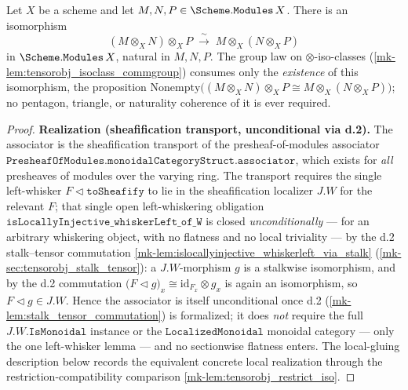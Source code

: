 \begin{lemma}\label{mk-lem:tensorobj_assoc_iso}
  \leanok

  Let \(X\) be a scheme and let
  \(M, N, P \in \Scheme.\mathtt{Modules}\,X\). There is an isomorphism
  \[
    (M \otimes_X N) \otimes_X P
      \;\xrightarrow{\ \sim\ }\;
    M \otimes_X (N \otimes_X P)
  \]
  in \(\Scheme.\mathtt{Modules}\,X\), natural in \(M, N, P\). The group law on
  \(\otimes\)-iso-classes (\ref{mk-lem:tensorobj_isoclass_commgroup}) consumes only
  the \emph{existence} of this isomorphism, the proposition
  \(\mathrm{Nonempty}\bigl((M \otimes_X N) \otimes_X P \cong M \otimes_X (N
  \otimes_X P)\bigr)\); no pentagon, triangle, or naturality coherence of it is
  ever required.

\begin{proof}
  \textbf{Realization (sheafification transport, unconditional via d.2).} The
  associator is the sheafification transport of the presheaf-of-modules associator
  \(\mathtt{PresheafOfModules.monoidalCategoryStruct.associator}\), which exists for
  \emph{all} presheaves of modules over the varying ring. The transport requires the
  single left-whisker \(F \triangleleft \mathtt{toSheafify}\) to lie in the
  sheafification localizer \(J.W\) for the relevant \(F\); that single open
  left-whiskering obligation \(\mathtt{isLocallyInjective\_whiskerLeft\_of\_W}\) is
  closed \emph{unconditionally} --- for an arbitrary whiskering object, with no
  flatness and no local triviality --- by the d.2 stalk--tensor commutation
  \ref{mk-lem:islocallyinjective_whiskerleft_via_stalk} (\ref{mk-sec:tensorobj_stalk_tensor}):
  a \(J.W\)-morphism \(g\) is a stalkwise isomorphism, and by the d.2 commutation
  \(\bigl(F \triangleleft g\bigr)_x \cong \mathrm{id}_{F_x} \otimes g_x\) is again an
  isomorphism, so \(F \triangleleft g \in J.W\). Hence the associator is itself
  unconditional once d.2 (\ref{mk-lem:stalk_tensor_commutation}) is
  formalized; it does \emph{not} require the full \(J.W.\mathtt{IsMonoidal}\) instance
  or the \(\mathtt{LocalizedMonoidal}\) monoidal category --- only the one left-whisker
  lemma --- and no sectionwise flatness enters. The local-gluing description below
  records the equivalent concrete local realization through the
  restriction-compatibility comparison \ref{mk-lem:tensorobj_restrict_iso}.


\end{proof}
\end{lemma}
